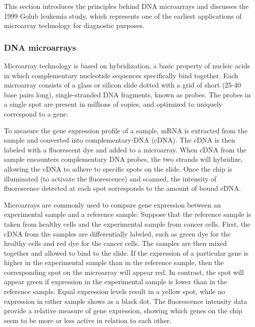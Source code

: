 This section introduces the principles behind DNA microarrays and discusses the 1999 Golub leukemia study, which represents one of the earliest applications of microarray technology for diagnostic purposes. 

\subsubsection{DNA microarrays}


Microarray technology is based on hybridization, a basic property of nucleic acids in which complementary nucleotide sequences specifically bind together. Each microarray consists of a glass or silicon slide dotted with a grid of short (25-40 base pairs long), single-stranded DNA fragments, known as probes. The probes in a single spot are present in millions of copies, and optimized to uniquely correspond to a gene. 

To measure the gene expression profile of a sample, mRNA is extracted from the sample and converted into complementary-DNA (cDNA). The cDNA is then labeled with a fluorescent dye and added to a microarray. When cDNA from the sample encounters complementary DNA probes, the two strands will hybridize, allowing the cDNA to adhere to specific spots on the slide. Once the chip is illuminated (to activate the fluorescence) and scanned, the intensity of fluorescence detected at each spot corresponds to the amount of bound cDNA.

Microarrays are commonly used to compare gene expression between an experimental sample and a reference sample. Suppose that the reference sample is taken from healthy cells and the experimental sample from cancer cells. First, the cDNA from the samples are differentially labeled, such as green dye for the healthy cells and red dye for the cancer cells. The samples are then mixed together and allowed to bind to the slide. If the expression of a particular gene is higher in the experimental sample than in the reference sample, then the corresponding spot on the microarray will appear red. In contrast, the spot will appear green if expression in the experimental sample is lower than in the reference sample. Equal expression levels result in a yellow spot, while no expression in either sample shows as a black dot. The fluorescence intensity data provide a relative measure of gene expression, showing which genes on the chip seem to be more or less active in relation to each other. 

\textD{\newpage}

